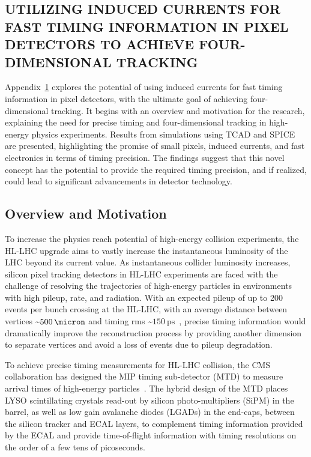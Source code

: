 \begin{refsection}

\chapter{UTILIZING INDUCED CURRENTS FOR FAST TIMING INFORMATION IN PIXEL DETECTORS TO ACHIEVE FOUR-DIMENSIONAL TRACKING}
\label{Fast_Timing}

\begin{cabstract}
Appendix~\ref{Fast_Timing} explores the potential of using induced currents for fast timing information in pixel detectors, with the ultimate goal of achieving four-dimensional tracking. 
It begins with an overview and motivation for the research, explaining the need for precise timing and four-dimensional tracking in high-energy physics experiments. 
Results from simulations using TCAD and SPICE are presented, highlighting the promise of small pixels, induced currents, and fast electronics in terms of timing precision. 
The findings suggest that this novel concept has the potential to provide the required timing precision, and if realized, could lead to significant advancements in detector technology.
\end{cabstract}

\section{Overview and Motivation}
To increase the physics reach potential of high-energy collision experiments, the HL-LHC upgrade aims to vastly increase the instantaneous luminosity of the LHC beyond its current value. 
As instantaneous collider luminosity increases, silicon pixel tracking detectors in HL-LHC experiments are faced with the challenge of resolving the trajectories of high-energy particles in environments with high pileup, rate, and radiation.
With an expected pileup of up to 200 events per bunch crossing at the HL-LHC, with an average distance between vertices \sim$\SI{500}{\micron}$ and timing rms \sim$\SI{150}{\ps}$~\cite{CARTIGLIA201747}, precise timing information would dramatically improve the reconstruction process by providing another dimension to separate vertices and avoid a loss of events due to pileup degradation.

To achieve precise timing measurements for HL-LHC collision, the CMS collaboration has designed the MIP timing sub-detector (MTD) to measure arrival times of high-energy particles~\cite{CMS:2667167}.
The hybrid design of the MTD places LYSO scintillating crystals read-out by silicon photo-multipliers (SiPM) in the barrel, as well as low gain avalanche diodes (LGADs) in the end-caps, between the silicon tracker and ECAL layers, to complement timing information provided by the ECAL and provide time-of-flight information with timing resolutions on the order of a few tens of picoseconds.


\end{refsection}
